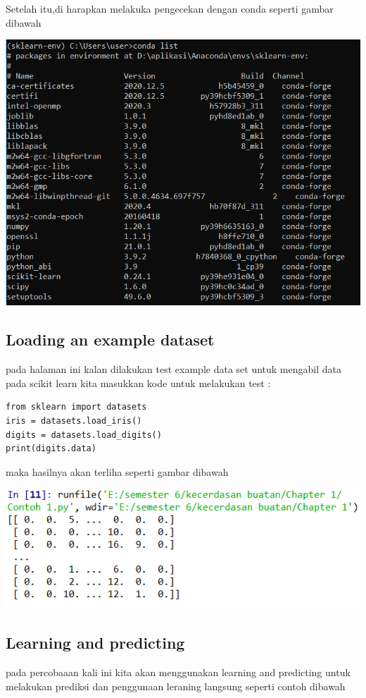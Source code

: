 \documentclass{homework}
\begin{document}
Setelah itu,di harapkan melakuka pengecekan dengan conda seperti gambar dibawah
\begin{center}
    \includegraphics[width=.8\textwidth]{figures/1184100/instal3.PNG}
\end{center}

\subsection{Loading an example dataset}
pada halaman ini kalan dilakukan test example data set untuk mengabil data pada scikit learn 
kita masukkan kode untuk melakukan test :

\begin{verbatim}
from sklearn import datasets
iris = datasets.load_iris()
digits = datasets.load_digits()
print(digits.data)
\end{verbatim}
maka hasilnya akan terliha seperti gambar dibawah 

\begin{center}
    \includegraphics[width=.8\textwidth]{figures/1184100/hasil1.PNG}
\end{center}

\subsection{Learning and predicting}
pada percobaaan kali ini kita akan menggunakan learning and predicting untuk melakukan prediksi dan penggunaan leraning langsung seperti contoh dibawah
\end{document}
